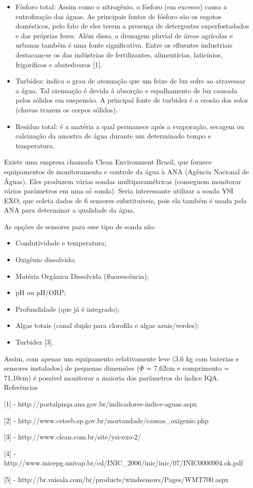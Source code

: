 \documentclass[12pt,openright,oneside,a4paper,brazil]{abntex2}
\begin{document}
\begin{itemize}
\item Fósforo total: Assim como o nitrogênio, o fósforo (em excesso) causa a eutrofização das águas. As principais fontes de fósforo são os esgotos domésticos, pelo fato de eles terem a presença de detergentes superfostadados e das próprias fezes. Além disso, a drenagem pluvial de áreas agrícolas e urbanas também é uma fonte significativa. Entre os efluentes industriais destacam-se os das indústrias de fertilizantes, alimentícias, laticínios, frigoríficos e abatedouros [1].
\item Turbidez: indica o grau de atenuação que um feixe de luz sofre ao atravessar a água. Tal atenuação é devida à absorção e espalhamento de luz causada pelos sólidos em suspensão. A principal fonte de turbidez é a erosão dos solos (chuvas trazem os corpos sólidos).
\item Resíduo total: é a matéria a qual permanece após a evaporação, secagem ou calcinação da amostra de água durante um determinado tempo e temperatura.

\end{itemize}
Existe uma empresa chamada Clean Environment Brasil, que fornece equipamentos de monitoramento e controle da água à ANA (Agência Nacional de Águas). Eles produzem várias sondas multiparamétricas (conseguem monitorar vários parâmetros em uma só sonda). 
Seria interessante utilizar a sonda YSI EXO, que coleta dados de 6 sensores substituíveis, pois ela também é usada pela ANA para determinar a qualidade da água.

As opções de sensores para esse tipo de sonda são:
\begin{itemize}
\item Condutividade e temperatura;
\item Oxigênio dissolvido;
\item Matéria Orgânica Dissolvida (fluorescência);
\item pH ou pH/ORP;
\item Profundidade (que já é integrado);
\item Algas totais (canal duplo para clorofila e algas azuis/verdes);
\item Turbidez [3].
\end{itemize}
Assim, com apenas um equipamento relativamente leve (3,6 kg com baterias e sensores instalados) de pequenas dimensões ($\Phi$ = 7,62cm e comprimento = 71,10cm) é possível monitorar a maioria dos parâmetros do índice IQA.
\newpage
Referências

[1] - http://portalpnqa.ana.gov.br/indicadores-indice-aguas.aspx

[2] - http://www.cetesb.sp.gov.br/mortandade/causas\_oxigenio.php

[3] - http://www.clean.com.br/site/ysi-exo-2/

[4] - http://www.inicepg.univap.br/cd/INIC\_2006/inic/inic/07/INIC0000904.ok.pdf

[5] - http://br.vaisala.com/br/products/windsensors/Pages/WMT700.aspx
\end{document}
